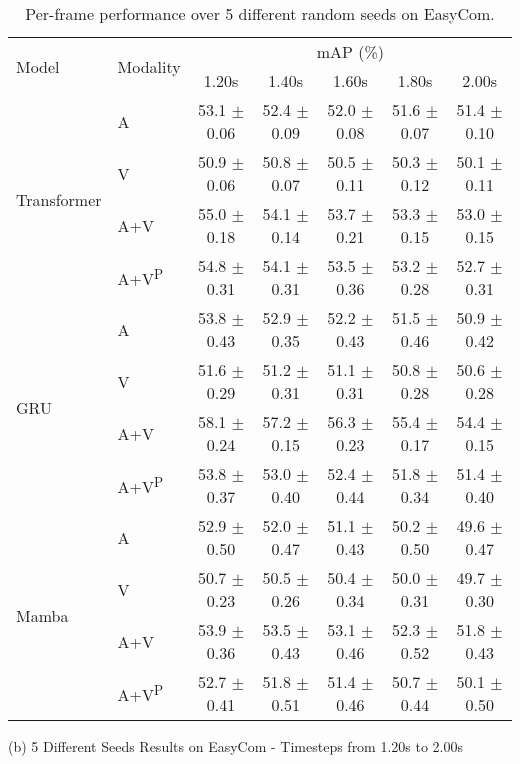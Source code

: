 \begin{table*}[t]
\begin{subtable}{\textwidth}
\centering
\begin{adjustbox}{width=\textwidth, center}
\begin{tabular}{llccccc}
\toprule
\multirow{2}{*}{Model} & \multirow{2}{*}{Modality} & \multicolumn{5}{c}{mAP (\%)} \\
\cmidrule(lr){3-7}
 & & 1.20s & 1.40s & 1.60s & 1.80s & 2.00s \\
\midrule
\multirow{4}{*}{\centering Transformer} 
 & A &  53.1 $\pm$ 0.06 & 52.4 $\pm$ 0.09 & 52.0 $\pm$ 0.08 & 51.6 $\pm$ 0.07 & 51.4 $\pm$ 0.10 
 \\
 & V &  50.9 $\pm$ 0.06 & 50.8 $\pm$ 0.07 & 50.5 $\pm$ 0.11 & 50.3 $\pm$ 0.12 & 50.1 $\pm$ 0.11 
 \\
 & A+V & 55.0 $\pm$ 0.18 & 54.1 $\pm$ 0.14 & 53.7 $\pm$ 0.21 & 53.3 $\pm$ 0.15 & 53.0 $\pm$ 0.15 
 \\
 & A+V\textsuperscript{P} & 54.8 $\pm$ 0.31 & 54.1 $\pm$ 0.31 & 53.5 $\pm$ 0.36 & 53.2 $\pm$ 0.28 & 52.7 $\pm$ 0.31 
\\
\midrule
\multirow{4}{*}{\centering GRU} 
 & A &  53.8 $\pm$ 0.43 & 52.9 $\pm$ 0.35 & 52.2 $\pm$ 0.43 & 51.5 $\pm$ 0.46 & 50.9 $\pm$ 0.42 
 \\
 & V &  51.6 $\pm$ 0.29 & 51.2 $\pm$ 0.31 & 51.1 $\pm$ 0.31 & 50.8 $\pm$ 0.28 & 50.6 $\pm$ 0.28 
 \\
 & A+V & 58.1 $\pm$ 0.24 & 57.2 $\pm$ 0.15 & 56.3 $\pm$ 0.23 & 55.4 $\pm$ 0.17 & 54.4 $\pm$ 0.15 
 \\
 & A+V\textsuperscript{P} & 53.8 $\pm$ 0.37 & 53.0 $\pm$ 0.40 & 52.4 $\pm$ 0.44 & 51.8 $\pm$ 0.34 & 51.4 $\pm$ 0.40 
 \\
\midrule
\multirow{4}{*}{\centering Mamba} 
 & A &  52.9 $\pm$ 0.50 & 52.0 $\pm$ 0.47 & 51.1 $\pm$ 0.43 & 50.2 $\pm$ 0.50 & 49.6 $\pm$ 0.47 
 \\
 & V &  50.7 $\pm$ 0.23 & 50.5 $\pm$ 0.26 & 50.4 $\pm$ 0.34 & 50.0 $\pm$ 0.31 & 49.7 $\pm$ 0.30 
 \\
 & A+V & 53.9 $\pm$ 0.36 & 53.5 $\pm$ 0.43 & 53.1 $\pm$ 0.46 & 52.3 $\pm$ 0.52 & 51.8 $\pm$ 0.43 
 \\
 & A+V\textsuperscript{P} & 52.7 $\pm$ 0.41 & 51.8 $\pm$ 0.51 & 51.4 $\pm$ 0.46 & 50.7 $\pm$ 0.44 & 50.1 $\pm$ 0.50 
 \\
\bottomrule
\end{tabular}
\end{adjustbox}
\label{tab:timesteps_different_seeds_EasyCom_b}
\caption*{(b) 5 Different Seeds Results on EasyCom - Timesteps from 1.20s to 2.00s} 
\end{subtable}


\caption{Per-frame performance over 5 different random seeds on EasyCom.}

\label{tab:main_result_error_bar_easycom}
\end{table*}
